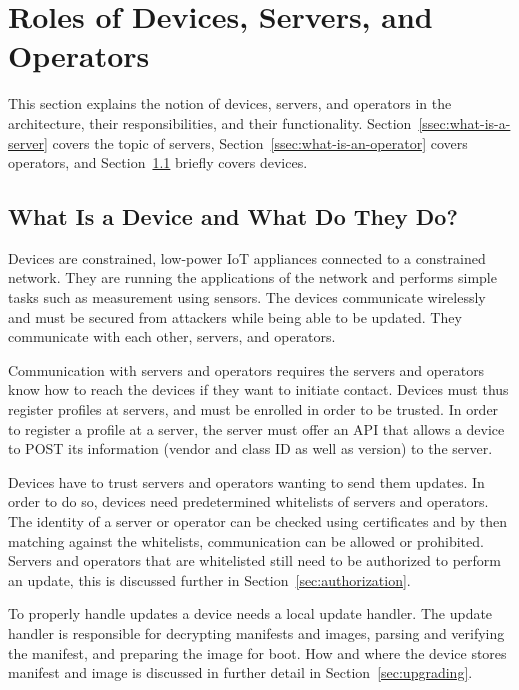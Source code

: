 \documentclass[0-thesis.tex]{subfiles}
\begin{document}
\section{Roles of Devices, Servers, and Operators}
\label{sec:roles}
This section explains the notion of devices, servers, and operators in the architecture,
their responsibilities, and their functionality. Section~\ref{ssec:what-is-a-server}
covers the topic of servers, Section~\ref{ssec:what-is-an-operator} covers operators, and
Section~\ref{ssec:what-is-a-device} briefly covers devices.

\subsection{What Is a Device and What Do They Do?}
\label{ssec:what-is-a-device}
Devices are constrained, low-power IoT appliances connected to a constrained network. They
are running the applications of the network and performs simple tasks such as measurement
using sensors. The devices communicate wirelessly and must be secured from attackers while
being able to be updated. They communicate with each other, servers, and operators.

Communication with servers and operators requires the servers and operators know how to
reach the devices if they want to initiate contact. Devices must thus register profiles at
servers, and must be enrolled in order to be trusted. In order to register a profile at a
server, the server must offer an API that allows a device to POST its information
(vendor and class ID as well as version) to the server. 

Devices have to trust servers and operators wanting to send them updates. In order to do
so, devices need predetermined whitelists of servers and operators. The identity of a
server or operator can be checked using certificates and by then matching against the
whitelists, communication can be allowed or prohibited. Servers and operators that are
whitelisted still need to be authorized to perform an update, this is discussed further in
Section~\ref{sec:authorization}.

To properly handle updates a device needs a local update handler. The update handler is
responsible for decrypting manifests and images, parsing and verifying the manifest, and
preparing the image for boot. How and where the device stores manifest and image is
discussed in further detail in Section~\ref{sec:upgrading}.
\end{document}
